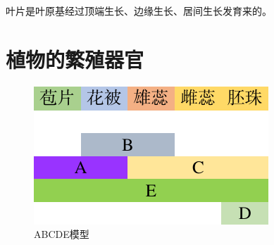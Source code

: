 	叶片是叶原基经过顶端生长、边缘生长、居间生长发育来的。
	
	
	
	\section{植物的繁殖器官}

\begin{figure}[h]
	\centering
	\includegraphics{Pics/ABCDE模型.pdf}
	\caption[ABCDE模型]{ABCDE模型}
	\label{fig:abcde}
\end{figure}
